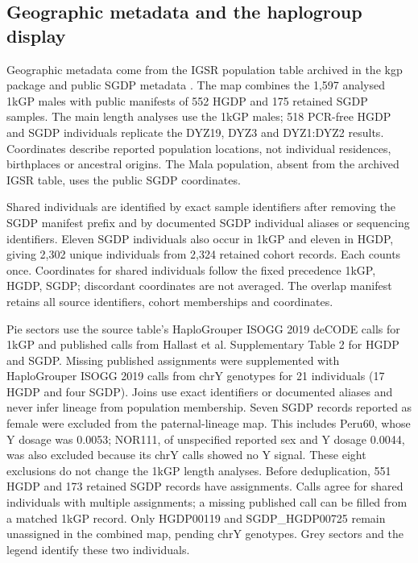 

\subsection{Geographic metadata and the haplogroup display}\label{sec:m-geography}
Geographic metadata come from the IGSR population table archived in the kgp package and public SGDP metadata \cite{Bergstrom2020,Mallick2016}. The map combines the 1,597 analysed 1kGP males with public manifests of 552 HGDP and 175 retained SGDP samples. The main length analyses use the 1kGP males; 518 PCR-free HGDP and SGDP individuals replicate the DYZ19, DYZ3 and DYZ1:DYZ2 results. Coordinates describe reported population locations, not individual residences, birthplaces or ancestral origins. The Mala population, absent from the archived IGSR table, uses the public SGDP coordinates.

Shared individuals are identified by exact sample identifiers after removing the SGDP manifest prefix and by documented SGDP individual aliases or sequencing identifiers. Eleven SGDP individuals also occur in 1kGP and eleven in HGDP, giving 2,302 unique individuals from 2,324 retained cohort records. Each counts once. Coordinates for shared individuals follow the fixed precedence 1kGP, HGDP, SGDP; discordant coordinates are not averaged. The overlap manifest retains all source identifiers, cohort memberships and coordinates.

Pie sectors use the source table's HaploGrouper ISOGG 2019 deCODE calls for 1kGP and published calls from Hallast et al. Supplementary Table 2 \cite{Hallast2021} for HGDP and SGDP. Missing published assignments were supplemented with HaploGrouper ISOGG 2019 calls from chrY genotypes for 21 individuals (17 HGDP and four SGDP). Joins use exact identifiers or documented aliases and never infer lineage from population membership. Seven SGDP records reported as female were excluded from the paternal-lineage map. This includes Peru60, whose Y dosage was 0.0053; NOR111, of unspecified reported sex and Y dosage 0.0044, was also excluded because its chrY calls showed no Y signal. These eight exclusions do not change the 1kGP length analyses. Before deduplication, 551 HGDP and 173 retained SGDP records have assignments. Calls agree for shared individuals with multiple assignments; a missing published call can be filled from a matched 1kGP record. Only HGDP00119 and SGDP\_HGDP00725 remain unassigned in the combined map, pending chrY genotypes. Grey sectors and the legend identify these two individuals.

